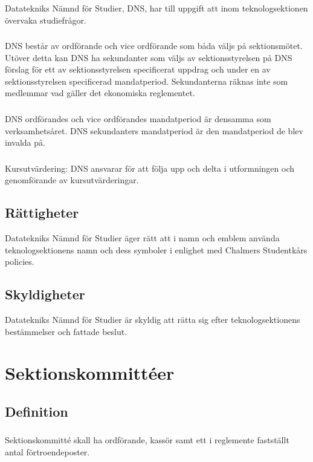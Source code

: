 \documentclass[a4paper]{dtek}
\begin{document}
\subsubsection{}
Datatekniks Nämnd för Studier, DNS, har till uppgift att inom teknologsektionen övervaka studiefrågor.
\subsubsection{}
DNS består av ordförande och vice ordförande som båda väljs på sektionsmötet. Utöver detta kan DNS ha sekundanter som väljs av sektionsstyrelsen på DNS förslag för ett av sektionsstyrelsen specificerat uppdrag och under en av sektionsstyrelsen specificerad mandatperiod. Sekundanterna räknas inte som medlemmar vad gäller det ekonomiska reglementet.
\subsubsection{}
DNS ordförandes och vice ordförandes mandatperiod är densamma som verksamhetsåret. DNS sekundanters mandatperiod är den mandatperiod de blev invalda på.
\subsubsection{}
Kursutvärdering: DNS ansvarar för att följa upp och delta i utformningen och genomförande av kursutvärderingar.
\subsection{Rättigheter}
Datatekniks Nämnd för Studier äger rätt att i namn och emblem använda teknologsektionens namn och dess symboler i enlighet med Chalmers Studentkårs policies.
\subsection{Skyldigheter}
Datatekniks Nämnd för Studier är skyldig att rätta sig efter teknologsektionens bestämmelser och fattade beslut.
\newpage

\section{Sektionskommittéer}
\subsection{Definition}
\subsubsection{}
Sektionskommitté skall ha ordförande, kassör samt ett i reglemente fastställt antal förtroendeposter.
\end{document}
